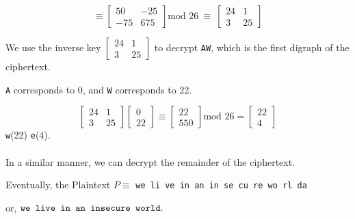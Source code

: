 \documentclass[a4paper,12pt]{article}
\begin{document}
\begin{tcolorbox}
    \begin{equation*}
        \equiv \begin{bmatrix}
            50 & -25 \\
            -75 & 675
        \end{bmatrix}\mbox{mod 26}\ \equiv\ \begin{bmatrix}
            24 & 1 \\
            3 & 25
        \end{bmatrix}
    \end{equation*}
    \end{tcolorbox}

    \vspace*{0.5cm}


    We use the inverse key $\begin{bmatrix}
        24 & 1 \\
        3 & 25
    \end{bmatrix}$ to decrypt \texttt{AW}, which is the first digraph of the ciphertext.

    \vspace*{0.2cm}

    \texttt{A} corresponds to 0, and \texttt{W} corresponds to 22.

    $$\begin{bmatrix}
        24 & 1 \\
        3 & 25
    \end{bmatrix}
    \begin{bmatrix}
        0 \\
        22
    \end{bmatrix} \equiv \begin{bmatrix}
        22 \\
        550
    \end{bmatrix}\mbox{mod 26} = \begin{bmatrix}
        22 \\
        4
    \end{bmatrix}$$
    \texttt{w}(22) \texttt{e}(4).

    \paragraph*{}

    In a similar manner, we can decrypt the remainder of the ciphertext.

    Eventually, the Plaintext $P \equiv$ \texttt{we li ve in an in se cu re wo rl da}
    

    or, $\mbox{\texttt{we live in an insecure world}.}$
\end{document}
